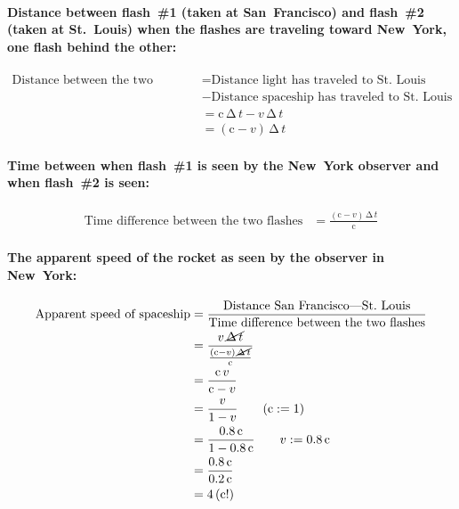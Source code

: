 \documentclass[pagesize,headsepline,10pt,parskip=half]{scrreprt}
\newcommand*\mdelta[1]{\ensuremath{\mathrm{\Delta\,}#1}}
\newcommand{\const}[1]{\ensuremath{\mathrm{#1}}}
\renewcommand{\c}{\const{c}}
\begin{document}
        \paragraph{Distance between flash~\#1 (taken at San~Francisco) and
          flash~\#2 (taken at St.~Louis) when the flashes are traveling
          toward New~York, one flash behind the other:}
          \begin{samepage}
            \begin{align*}
              \text{Distance between the two flashes}
                &= \text{Distance light has traveled to St.~Louis}\\
                  &- \text{Distance spaceship has traveled to St.~Louis}\\
                &= \c \, \mdelta{t} - v \, \mdelta{t}\\
                &= (\c - v) \, \mdelta{t}
            \end{align*}
          \end{samepage}

        \paragraph{Time between when flash~\#1 is seen by the New~York observer
          and when flash~\#2 is seen:}
          \begin{align*}
            \text{Time difference between the two flashes}
              &= \frac{(\c - v) \, \mdelta{t}}{\c}
          \end{align*}

        \paragraph{The apparent speed of the rocket as seen by the observer
          in New~York:}
          \begin{samepage}
            \begin{align*}
              \text{Apparent speed of spaceship}
                &= \frac{\text{Distance San~Francisco---St.~Louis}}
                        {\text{Time difference between the two flashes}}\\
                &= \frac{v \, \cancel{\mdelta{t}}}
                        {\frac{(\c - v) \, \cancel{\mdelta{t}}}{\c}}\\
                &= \frac{\c \, v}{\c - v}\\
                &= \frac{v}{1 - v} \qquad \text{($\c := 1$)}\\
                &= \frac{\SI{0.8}{\c}}{1 - \SI{0.8}{\c}} \qquad \text{$v := \SI{0.8}{\c}$}\\
                &= \frac{\SI{0.8}{\c}}{\SI{0.2}{\c}}\\
                &= 4 \, \text{(\c!)}
            \end{align*}
          \end{samepage}
\end{document}
